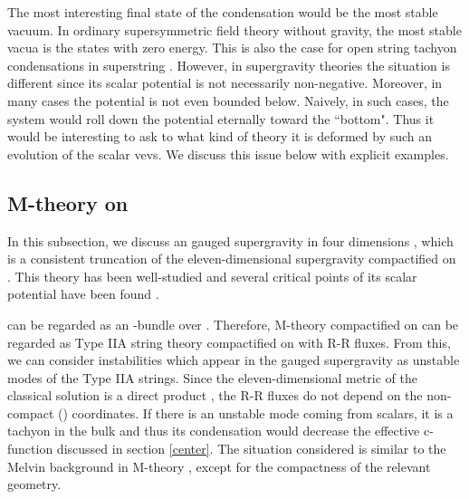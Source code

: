 \documentclass[a4paper,a4paper]{article}
\begin{document}
The most interesting final state of the condensation would be the most stable vacuum. 
In ordinary supersymmetric field theory without gravity, the most stable vacua is the states with zero energy. 
This is also the case for open string tachyon condensations in superstring \cite{open}. 
However, in supergravity theories the situation is different since its scalar potential is not necessarily 
non-negative. 
Moreover, in many cases the potential is not even bounded below. 
Naively, in such cases, the system would roll down the potential eternally toward the ``bottom". 
Thus it would be interesting to ask to what kind of theory it is deformed by such an evolution of the scalar vevs. 
We discuss this issue below with explicit examples. 




















\vspace{5mm}

\subsection{M-theory on \coordHE{}}

\vspace{5mm}

In this subsection, we discuss an \coordHE{} gauged supergravity in four dimensions \cite{CJ}, which is a 
consistent truncation of the eleven-dimensional supergravity compactified on \coordHE{} \cite{truncation}. 
This theory has been well-studied and several critical points of its scalar potential have been found 
\cite{extrema}. 

\coordHE{} can be regarded as an \coordHE{}-bundle over \coordHE{}. 
Therefore, M-theory compactified on \coordHE{} can be regarded as Type IIA string theory compactified on \coordHE{} with 
R-R fluxes. 
From this, we can consider instabilities which appear in the gauged supergravity as unstable modes of the Type IIA 
strings. 
Since the eleven-dimensional metric of the classical solution is a direct product \coordHE{}, the R-R 
fluxes do not depend on the non-compact (\coordHE{}) coordinates. 
If there is an unstable mode coming from scalars, it is a tachyon in the bulk and thus its condensation would 
decrease the effective c-function discussed in section \ref{center}. 
The situation considered is similar to the Melvin background in M-theory \cite{Melvin}, except for the 
compactness of the relevant geometry. 
\end{document}
